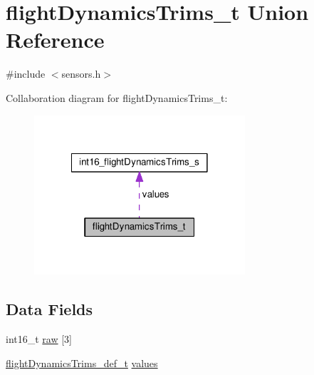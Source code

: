\hypertarget{unionflightDynamicsTrims__t}{\section{flight\+Dynamics\+Trims\+\_\+t Union Reference}
\label{unionflightDynamicsTrims__t}
}


{\ttfamily \#include $<$sensors.\+h$>$}



Collaboration diagram for flight\+Dynamics\+Trims\+\_\+t\+:\nopagebreak
\begin{figure}[H]
\begin{center}
\leavevmode
\includegraphics[width=222pt]{unionflightDynamicsTrims__t__coll__graph}
\end{center}
\end{figure}
\subsection*{Data Fields}
\begin{DoxyCompactItemize}
\item 
int16\+\_\+t \hyperlink{unionflightDynamicsTrims__t_a6f8db9985687ddf7f957d83a5a3fee9a}{raw} \mbox{[}3\mbox{]}
\item 
\hyperlink{sensors_8h_af05b1dd64bf7155efe1eed7b2862cb75}{flight\+Dynamics\+Trims\+\_\+def\+\_\+t} \hyperlink{unionflightDynamicsTrims__t_ae18b1c5536bbc8f659b573927cacf0ec}{values}
\end{DoxyCompactItemize}


